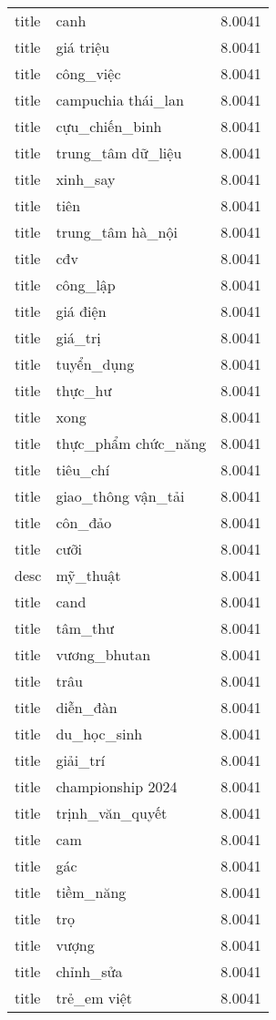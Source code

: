 \documentclass{article}
\begin{document}
\begin{tabular}{lll}
title & canh & 8.0041\\
title & giá triệu & 8.0041\\
title & công\_việc & 8.0041\\
title & campuchia thái\_lan & 8.0041\\
title & cựu\_chiến\_binh & 8.0041\\
title & trung\_tâm dữ\_liệu & 8.0041\\
title & xinh\_say & 8.0041\\
title & tiên & 8.0041\\
title & trung\_tâm hà\_nội & 8.0041\\
title & cđv & 8.0041\\
title & công\_lập & 8.0041\\
title & giá điện & 8.0041\\
title & giá\_trị & 8.0041\\
title & tuyển\_dụng & 8.0041\\
title & thực\_hư & 8.0041\\
title & xong & 8.0041\\
title & thực\_phẩm chức\_năng & 8.0041\\
title & tiêu\_chí & 8.0041\\
title & giao\_thông vận\_tải & 8.0041\\
title & côn\_đảo & 8.0041\\
title & cưỡi & 8.0041\\
desc & mỹ\_thuật & 8.0041\\
title & cand & 8.0041\\
title & tâm\_thư & 8.0041\\
title & vương\_bhutan & 8.0041\\
title & trâu & 8.0041\\
title & diễn\_đàn & 8.0041\\
title & du\_học\_sinh & 8.0041\\
title & giải\_trí & 8.0041\\
title & championship 2024 & 8.0041\\
title & trịnh\_văn\_quyết & 8.0041\\
title & cam & 8.0041\\
title & gác & 8.0041\\
title & tiềm\_năng & 8.0041\\
title & trọ & 8.0041\\
title & vượng & 8.0041\\
title & chỉnh\_sửa & 8.0041\\
title & trẻ\_em việt & 8.0041\\

\end{tabular}
\end{document}
